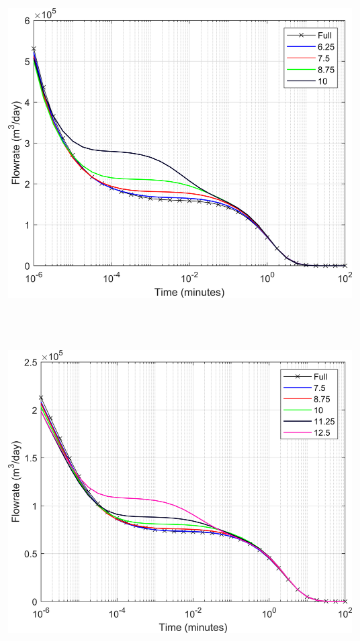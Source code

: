 \documentclass[Supplementary.tex]{subfiles}
\begin{document}
\begin{figure}[ht]
\begin{subfigure}{0.3\textwidth}
     \end{subfigure}
     \begin{subfigure}{0.3\textwidth}
        \includegraphics[width=\textwidth]{3D_DD/Plot_Drawdown_Case_03_nohead.png}
        \label{fig:3D_DD_3}
     \end{subfigure}
     \\
     \begin{subfigure}{0.3\textwidth}
        \includegraphics[width=\textwidth]{3D_DD/Plot_Drawdown_Case_04_nohead.png}

\end{subfigure}
\end{figure}
\end{document}
